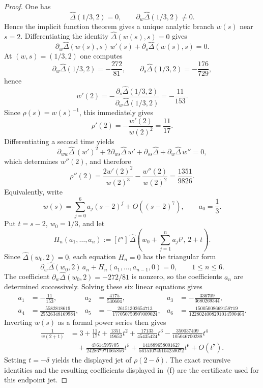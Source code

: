 \begin{proof}
One has
\[
  \widehat\Delta(1/3,2)=0,\qquad
  \partial_w\widehat\Delta(1/3,2)\neq 0.
\]
Hence the implicit function theorem gives a unique analytic branch
\(w(s)\) near \(s=2\). Differentiating the identity
\(\widehat\Delta(w(s),s)=0\) gives
\[
  \partial_w\widehat\Delta(w(s),s)\,w'(s)
  +\partial_s\widehat\Delta(w(s),s)=0.
\]
At \((w,s)=(1/3,2)\) one computes
\[
  \partial_w\widehat\Delta(1/3,2)=-\frac{272}{81},
  \qquad
  \partial_s\widehat\Delta(1/3,2)=-\frac{176}{729},
\]
hence
\[
  w'(2)
  =-\frac{\partial_s\widehat\Delta(1/3,2)}
          {\partial_w\widehat\Delta(1/3,2)}
  =-\frac{11}{153}.
\]
Since \(\rho(s)=w(s)^{-1}\), this immediately gives
\[
  \rho'(2)=-\frac{w'(2)}{w(2)^2}=\frac{11}{17}.
\]
Differentiating a second time yields
\[
  \partial_{ww}\widehat\Delta\,(w')^2
  +2\partial_{ws}\widehat\Delta\,w'
  +\partial_{ss}\widehat\Delta
  +\partial_w\widehat\Delta\,w''=0,
\]
which determines \(w''(2)\), and therefore
\[
  \rho''(2)=\frac{2w'(2)^2}{w(2)^3}-\frac{w''(2)}{w(2)^2}
  =\frac{1351}{9826}.
\]
Equivalently, write
\[
  w(s)=\sum_{j=0}^6 a_j(s-2)^j+O((s-2)^7),
  \qquad a_0=\frac13 .
\]
Put \(t=s-2\), \(w_0=1/3\), and let
\[
  H_n(a_1,\ldots,a_n)
  :=[t^n]\,
    \widehat\Delta\!\left(w_0+\sum_{j=1}^n a_jt^j,\,2+t\right).
\]
Since \(\widehat\Delta(w_0,2)=0\), each equation \(H_n=0\) has the
triangular form
\[
  \partial_w\widehat\Delta(w_0,2)\,a_n
  +H_n(a_1,\ldots,a_{n-1},0)=0,
  \qquad 1\le n\le6.
\]
The coefficient \(\partial_w\widehat\Delta(w_0,2)=-272/81\) is nonzero,
so the coefficients \(a_n\) are determined successively. Solving these
six linear equations gives
\[
\begin{aligned}
  a_1&=-\frac{11}{153},&
  a_2&=\frac{4175}{530604},&
  a_3&=-\frac{336709}{3680269344},\\
  a_4&=\frac{5582818619}{25526348169984},&
  a_5&=-\frac{26151302654713}{177050750907009024},&
  a_6&=\frac{15005008669158719}{1228024008291014590464}.
\end{aligned}
\]
Inverting \(w(s)\) as a formal power series then gives
\[
\begin{aligned}
  \frac{1}{w(2+t)}
  &=3+\frac{11}{17}t+\frac{1351}{19652}t^2
    +\frac{17133}{45435424}t^3
    -\frac{350037409}{105046700288}t^4\\
  &\quad
    +\frac{47614595705}{242867971065856}t^5
    +\frac{141889658001627}{561510749104259072}t^6
    +O(t^7).
\end{aligned}
\]
Setting \(t=-\delta\) yields the displayed jet of
\(\rho(2-\delta)\). The exact recursive identities and the resulting
coefficients displayed in
\,\textup{(f)} are the certificate used
for this endpoint jet.
\end{proof}

